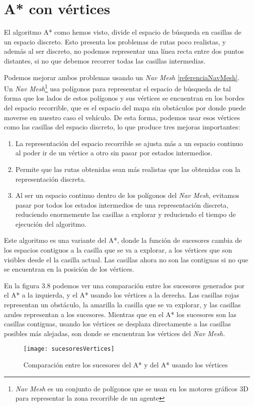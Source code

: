 \section{A* con vértices}
El algoritmo A* como hemos visto, divide el espacio de búsqueda en casillas de un espacio discreto. Esto presenta los problemas de rutas poco realistas, y además al ser discreto, no podemos representar una línea recta entre dos puntos distantes, si no que debemos recorrer todas las casillas intermedias.

Podemos mejorar ambos problemas usando un \textit{Nav Mesh} \ref{referenciaNavMesh}.  Un \textit{Nav Mesh}\footnote{\textit{Nav Mesh} es un conjunto de polígonos que se usan en los motores gráficos 3D para representar la zona recorrible de un agente} usa polígonos para representar el espacio de búsqueda de tal forma que los lados de estos polígonos y sus vértices se encuentran en los bordes del espacio recorrible, que es el espacio del mapa sin obstáculos por donde puede moverse en nuestro caso el vehículo. De esta forma, podemos usar esos vértices como las casillas del espacio discreto, lo que produce tres mejoras importantes:

\begin{enumerate}
\item La representación del espacio recorrible se ajusta más a un espacio continuo al poder ir de un vértice a otro sin pasar por estados intermedios.
\item Permite que las rutas obtenidas sean más realistas que las obtenidas con la representación discreta.
\item Al ser un espacio continuo dentro de los polígonos del \textit{Nav Mesh}, evitamos pasar por todos los estados intermedios de una representación discreta, reduciendo enormemente las casillas a explorar y reduciendo el tiempo de ejecución del algoritmo.
\end{enumerate}

Este algoritmo es una variante del A*, donde la función de sucesores cambia de los espacios contiguos a la casilla que se va a explorar, a los vértices que son visibles desde el la casilla actual. Las casillas ahora no son las contiguas si no que se encuentran en la posición de los vértices.

En la figura 3.8 podemos ver una comparación entre los sucesores generados por el A* a la izquierda, y el A* usando los vértices a la derecha. Las casillas rojas representan un obstáculo, la amarilla la casilla que se va explorar, y las casillas azules representan a los sucesores. Mientras que en el A* los sucesores son las casillas contiguas, usando los vértices se desplaza directamente a las casillas posibles más alejadas, son donde se encuentran los vértices del \textit{Nav Mesh.}
\begin{figure}[htpb]
    \centering
    \texttt{[image: sucesoresVertices]}
    \caption[Comparación entre los sucesores del A* y del A* usando los vértices]{Comparación entre los sucesores del A* y del A* usando los vértices}
    \label{fig:basics AFM sketch}
\end{figure}

